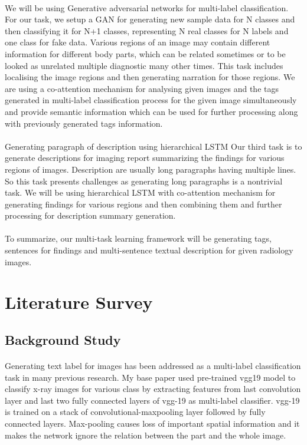\documentclass[12pt]{article}
\numberwithin{figure}{section}
\begin{document}
\paragraph{}
We will be using Generative adversarial networks for multi-label classification. For our task, we setup a GAN for generating new sample data for N classes and then classifying it for N+1 classes, representing N real classes for N labels and one class for fake data.
Various regions of an image may contain different information for different body parts, which can be related sometimes or to be looked as unrelated multiple diagnostic many other times. This task includes localising the image regions and then generating narration for those regions. We are using a co-attention mechanism for analysing given images and the tags generated in multi-label classification process for the given image simultaneously and provide semantic information which can be used for further processing along with previously generated tags information.
\paragraph{}
Generating paragraph of description using hierarchical LSTM
Our third task is to generate descriptions for imaging report summarizing the findings for various regions of images. Description are usually long paragraphs having multiple lines. So this task presents challenges as generating long paragraphs is a nontrivial task. We will be using hierarchical LSTM\cite{2} with co-attention mechanism for generating findings for various regions and then combining them and further processing for description summary generation.
\paragraph{}
To summarize, our multi-task learning framework  will be generating tags, sentences for findings and multi-sentence textual description for given radiology images.


\clearpage


\section{Literature Survey}
\subsection{Background Study}
\paragraph{}
Generating text label for images has been addressed as a multi-label classification task in many previous research. My base paper used pre-trained vgg19 model to classify x-ray images for various class by extracting features from last convolution layer and last two fully connected layers of vgg-19 as multi-label classifier. vgg-19 is trained on a stack of convolutional-maxpooling layer followed by fully connected layers. Max-pooling causes loss of important spatial information and it makes the network ignore the relation between the part and the whole image.
\end{document}
